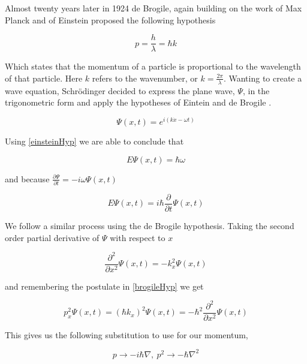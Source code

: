\documentclass[authoryearcitations]{UoYCSproject}
\begin{document}
Almost twenty years later in 1924 de Brogile, again building on the work of Max Planck and of Einstein proposed
the following hypothesis

\begin{equation}
p = \frac{h}{\lambda} = \hbar k 
\label{brogileHyp}
\end{equation}

Which states that the momentum of a particle is proportional to the wavelength of that particle. Here $k$ refers to the 
wavenumber, or $k = \frac{2\pi}{\lambda}$. Wanting to create a wave equation, Schr\"{o}dinger decided to express the plane
wave, $\Psi$, in the trigonometric form and apply the hypotheses of Eintein and de Brogile \cite{ricardo}. 

\begin{equation}
\Psi (x, t) = e^{i(k\dot x-\omega t)}
\end{equation}

Using \ref{einsteinHyp} we are able to conclude that

\begin{equation}
E\Psi (x,t) = \hbar\omega
\label{einsteinPart}
\end{equation}

and because $\frac{\partial\Psi}{\partial t} = -i\omega\Psi (x,t)$

\begin{equation}
E\Psi (x,t) = i\hbar\frac{\partial}{\partial t}\Psi (x,t)
\label{einsteinPart2}
\end{equation}

We follow a similar process using the de Brogile hypothesis. Taking the second order partial derivative of
$\Psi$ with respect to $x$ 

$$\frac{\partial ^2}{\partial x^2}\Psi (x,t) = -k_{x}^{2}\Psi(x,t) $$

and remembering the postulate in \ref{brogileHyp} we get

\begin{equation}
p_{x}^{2}\Psi (x,t) = (\hbar k_{x})^2\Psi (x,t) = -\hbar ^2\frac{\partial ^2}{\partial x^2}\Psi (x,t)
\label{brogile2}
\end{equation}

This gives us the following substitution to use for our momentum,

\begin{equation}
p \rightarrow -i\hbar \nabla,\ p^2 \rightarrow -\hbar\nabla ^2
\label{eq:momentumSub}
\end{equation}
\end{document}
